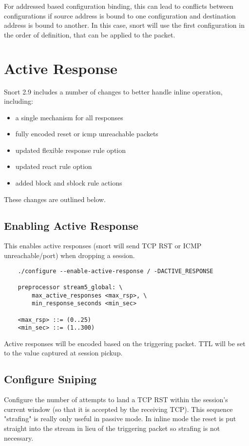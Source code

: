 \documentclass[english]{report}
\begin{document}
For addressed based configuration binding, this can lead to conflicts between configurations 
if source address is bound to one configuration and destination address is bound to another. 
In this case, snort will use the first configuration in the order of definition, that can be 
applied to the packet. 

\section{Active Response}

Snort 2.9 includes a number of changes to better handle inline operation,
including:

\begin{itemize}
\item a single mechanism for all responses
\item fully encoded reset or icmp unreachable packets
\item updated flexible response rule option
\item updated react rule option
\item added block and sblock rule actions
\end{itemize}

These changes are outlined below.

\subsection{Enabling Active Response}

This enables active responses (snort will send TCP RST or ICMP
unreachable/port) when dropping a session.

\begin{verbatim}
    ./configure --enable-active-response / -DACTIVE_RESPONSE

    preprocessor stream5_global: \
        max_active_responses <max_rsp>, \
        min_response_seconds <min_sec> 

    <max_rsp> ::= (0..25)
    <min_sec> ::= (1..300)
\end{verbatim}

Active responses will be encoded based on the triggering packet.  TTL will be
set to the value captured at session pickup.

\subsection{Configure Sniping}

Configure the number of attempts to land a TCP RST within the session's current
window (so that it is accepted by the receiving TCP).  This sequence "strafing"
is really only useful in passive mode.  In inline mode the reset is put
straight into the stream in lieu of the triggering packet so strafing is not
necessary.
\end{document}
